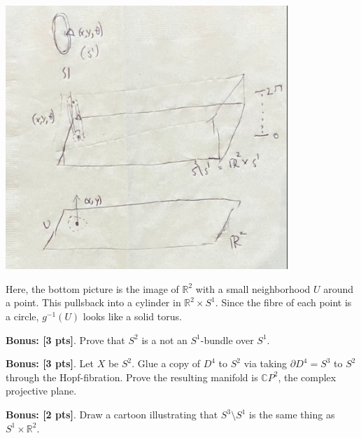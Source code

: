 \documentclass[12pt]{article}
\newcommand{\C}{\mathbb{C}}
\newcommand{\R}{\mathbb{R}}
\begin{document}
        \begin{center}
            \includegraphics*[width=0.8\textwidth]{S3 fibres.png}
        \end{center}

        Here, the bottom picture is the image of $\R^2$ with a small neighborhood $U$ around a point. This pullsback into a cylinder in $\R^2 \times S^1$. Since the fibre of each point is a circle, $g^{-1}(U)$ looks like a solid torus. 
    \color{black}


\pagebreak 

\textbf{Bonus: [3 pts]}.  Prove that $S^{2}$ is a not an $S^{1}$-bundle over $S^{1}$.

\textbf{Bonus: [3 pts]}.  Let $X$ be $S^{2}$.  Glue a copy of $D^{4}$ to $S^{2}$ via taking $\partial  D^{4} = S^{3}$ to $S^{2}$ through the Hopf-fibration.  Prove the resulting manifold is $\C P^{2}$, the complex projective plane. 

\textbf{Bonus: [2 pts]}.  Draw a cartoon illustrating that $S^{3}\setminus S^{1}$ is the same thing as $S^{1} \times \R^{2}$.  
\end{document}
